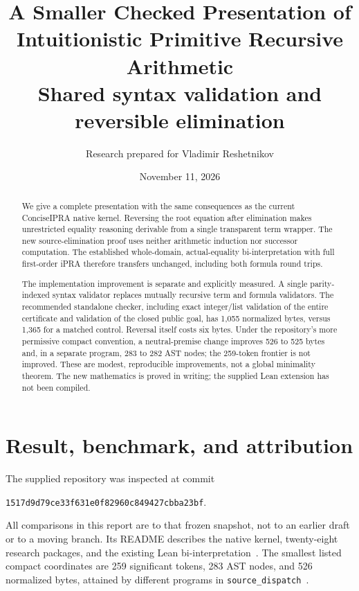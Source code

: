\documentclass[11pt,letterpaper]{article}
\title{\color{ink}\textbf{A Smaller Checked Presentation of\\Intuitionistic Primitive Recursive Arithmetic}\\[0.6em]
  \large Shared syntax validation and reversible elimination}
\author{Research prepared for Vladimir Reshetnikov}
\date{November 11, 2026}
\theoremstyle{definition}\newtheorem{definition}[theorem]{Definition}
\theoremstyle{remark}\newtheorem{remark}[theorem]{Remark}
\newcommand{\code}[1]{{\small\nolinkurl{#1}}}
\begin{document}
\maketitle
\begin{abstract}
We give a complete presentation with the same consequences as the current
ConciseIPRA native kernel. Reversing the root equation after elimination
makes unrestricted equality reasoning derivable from a single transparent
term wrapper. The new source-elimination proof uses neither arithmetic
induction nor successor computation. The established whole-domain,
actual-equality bi-interpretation with full first-order iPRA therefore
transfers unchanged, including both formula round trips.

The implementation improvement is separate and explicitly measured. A
single parity-indexed syntax validator replaces mutually recursive term
and formula validators. The recommended standalone checker, including
exact integer/list validation of the entire certificate and validation
of the closed public goal, has 1,055 normalized bytes, versus 1,365 for a
matched control. Reversal itself costs six bytes. Under the repository's
more permissive compact convention, a neutral-premise change improves
526 to 525 bytes and, in a separate program, 283 to 282 AST nodes; the
259-token frontier is not improved. These are modest, reproducible
improvements, not a global minimality theorem. The new mathematics is
proved in writing; the supplied Lean extension has not been compiled.
\end{abstract}

\section{Result, benchmark, and attribution}
\label{sec:result}

The supplied repository was inspected at commit
\begin{center}\code{1517d9d79ce33f631e0f82960c849427cbba23bf}.\end{center}
All comparisons in this report are to that frozen snapshot, not to an
earlier draft or to a moving branch. Its README describes the native
kernel, twenty-eight research packages, and the existing Lean
bi-interpretation~\cite{baseline}. The smallest listed compact coordinates
are 259 significant tokens, 283 AST nodes, and 526 normalized bytes,
attained by different programs in \code{source_dispatch}~\cite{source}.
\end{document}
